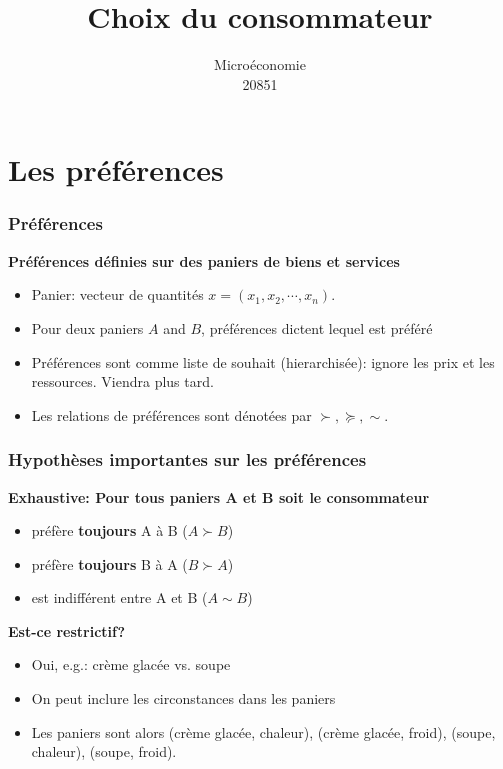 \documentclass[handout]{beamer}
\title{Choix du consommateur}
\author{Microéconomie \\ 20851}
\date{}
\begin{document}
\frame{\titlepage}

\section[Outline]{}
\frame{\tableofcontents}

\section{Les préférences}

\begin{frame}\frametitle{Préférences}
\textbf{Préférences définies sur des paniers de biens et services}
\begin{itemize} \item Panier: vecteur de quantités $x = (x_1, x_2,\cdots,x_n)$.
\item Pour deux paniers $A$ and $B$, préférences dictent lequel est préféré
\item Préférences sont comme liste de souhait (hierarchisée): ignore les prix et les ressources. Viendra plus tard. 
\item Les relations de préférences sont dénotées par $\succ,\succeq,\sim$. 
\end{itemize}

\end{frame}

\begin{frame}\frametitle{Hypothèses importantes sur les préférences}

\textbf{Exhaustive: Pour tous paniers A et B soit le consommateur}
\begin{itemize}
\item  préfère \textbf{toujours} A à B ($A\succ B$)
\item  préfère \textbf{toujours} B à A ($B\succ A$)
\item est indifférent entre A et B ($A \sim B$) \end{itemize}

\textbf{Est-ce restrictif?}
\begin{itemize}
\item Oui, e.g.: crème glacée vs. soupe
\item On peut inclure les circonstances dans les paniers
\item Les paniers sont alors (crème glacée, chaleur), (crème glacée, froid), (soupe, chaleur), (soupe, froid).
\end{itemize}
\end{frame}
\end{document}
